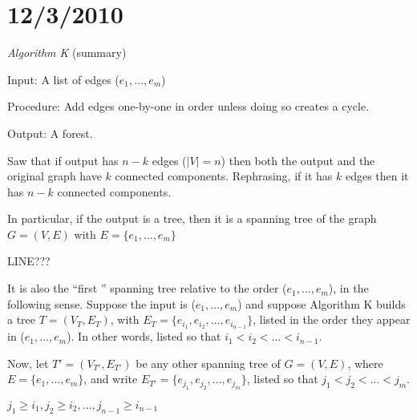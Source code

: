 \documentclass{article}
\begin{document}
\section*{12/3/2010}

\begin{rec}
\emph{Algorithm K} (summary)

Input: A list of edges ($e_1, \ldots, e_m$)

Procedure: Add edges one-by-one in order unless doing so creates a cycle.

Output: A forest.

Saw that if output has $n-k $ edges ($|V|=n$) then both the output and the original graph have $k$ connected components. Rephrasing, if it has $k$ edges then it has $n-k$ connected components.

In particular, if the output is a tree, then it is a spanning tree of the graph $G=(V,E)$ with $E = \{ e_1, \ldots, e_m\}$
\end{rec}

LINE???

It is also the ``first '' spanning tree relative to the order ($e_1, \ldots, e_m$), in the following sense.  Suppose the input is ($e_1, \ldots, e_m$) and suppose Algorithm K builds a tree $T=(V_T, E_T)$, with $E_T= \{e_{i_1}, e_{i_2}, \ldots, e_{i_{n-1}} \}$, listed in the order they appear in ($e_1, \ldots, e_m$).  In other words, listed so that $i_1 < i_2 < \ldots < i_{n-1}$.

Now, let $T' = (V_{T'}, E_{T'})$ be any other spanning tree of $G=(V,E)$, where $E= \{ e_1, \ldots, e_m\}$, and write $E_{T'} = \{ e_{j_1}, e_{j_2}, \ldots, e_{j_m}\}$, listed so that $j_1 < j_2 < \ldots < j_m$.

\begin{clm}
 $j_1 \ge i_1, j_2 \ge i_2, \ldots , j_{n-1} \ge i_{n-1}$
\end{clm}
\end{document}
